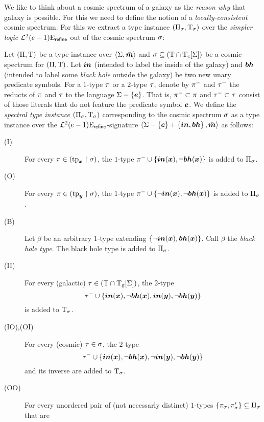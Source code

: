 We like to think about a cosmic spectrum of a galaxy as the \emph{reason why}
that galaxy is possible. For this we need to define the notion of a
\emph{locally-consistent} cosmic spectrum. For this we extract a type instance
$(\Pi_\sigma,\mathrm{T}_\sigma)$ over the \emph{simpler logic}
$\mathcal{L}^{2}_{{}}{(e-1)}\mathrm{E}_{\mathsf{refine}}$ out of the cosmic spectrum $\sigma$:
\begin{definition}
Let $(\Pi,\mathrm{T})$ be a type instance over $\left\langle \mathrm{\Sigma},\bar{\bm{m}} \right\rangle$ and $\sigma
\subseteq (\mathrm{T} \cap \mathrm{T}_{\mathrm{c}}[\mathrm{\Sigma}])$ be a cosmic spectrum for $(\Pi,\mathrm{T})$.
Let $\bm{in}$ (intended to label the inside of the galaxy) and $\bm{bh}$ (intended to
label some \emph{black hole} outside the galaxy) be two new unary predicate
symbols.
For a $1$-type $\pi$ or a $2$-type $\tau$, denote by $\pi^{-}$ and $\tau^{-}$ the reducts of $\pi$ and
$\tau$ to the language $\mathrm{\Sigma} - \left\{\bm{e}\right\}$.
That is, $\pi^{-} \subset \pi$ and $\tau^{-} \subset \tau$ consist of
those literals that do not feature the predicate symbol $\bm{e}$.
We define the \emph{spectral type instance} $(\Pi_\sigma,\mathrm{T}_\sigma)$
corresponding to the cosmic spectrum $\sigma$ as a type instance over
the $\mathcal{L}^{2}_{{}}{(e-1)}\mathrm{E}_{\mathsf{refine}}$-signature 
$\left\langle \mathrm{\Sigma} - \left\{\bm{e}\right\} + \left\{\bm{in},\bm{bh}\right\},\bar{\bm{m}} \right\rangle$ as follows:
\begin{description}
  \item[(I)] For every $\pi \in (\operatorname{tp}_{\bm{x}}\restriction\sigma)$,
  the $1$-type $\pi^{-} \cup \left\{\bm{in}(\bm{x}),\lnot\bm{bh}(\bm{x})\right\}$ is added to $\Pi_\sigma$.
  \item[(O)] For every $\pi \in (\operatorname{tp}_{\bm{y}}\restriction\sigma)$,
  the $1$-type $\pi^{-} \cup \left\{\lnot\bm{in}(\bm{x}),\lnot\bm{bh}(\bm{x})\right\}$ is added to $\Pi_\sigma$.
  \item[(B)] Let $\beta$ be an arbitrary $1$-type extending
  $\left\{\lnot\bm{in}(\bm{x}),\bm{bh}(\bm{x})\right\}$. Call $\beta$ the \emph{black hole type}.
  The black hole type is added to $\Pi_\sigma$.
  \item[(II)] For every (galactic) $\tau \in (\mathrm{T} \cap
  \mathrm{T}_{\mathrm{g}}[\mathrm{\Sigma}])$, the $2$-type
  \[
    \tau^{-} \cup \left\{\bm{in}(\bm{x}),\lnot\bm{bh}(\bm{x}),\bm{in}(\bm{y}),\lnot\bm{bh}(\bm{y})\right\}
  \]
  is added to $\mathrm{T}_\sigma$.
  \item[(IO),(OI)] For every (cosmic) $\tau \in \sigma$,
  the $2$-type
  \[
    \tau^{-} \cup \left\{\bm{in}(\bm{x}),\lnot\bm{bh}(\bm{x}),\lnot\bm{in}(\bm{y}),\lnot\bm{bh}(\bm{y})\right\}  
  \] and its inverse are added to $\mathrm{T}_\sigma$.
  \item[(OO)] For every unordered pair of (not necessarly
  distinct) $1$-types $\left\{\pi_\sigma, \pi_\sigma'\right\} \subseteq \Pi_\sigma$ that are

\end{description}
\end{definition}
